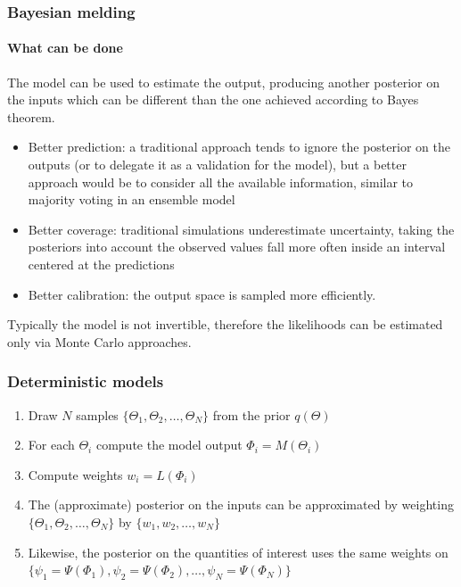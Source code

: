 \documentclass[aspectratio=43]{beamer}
\begin{document}
\begin{frame}
	\frametitle{Bayesian melding}
	\framesubtitle{What can be done}
	The model can be used to estimate the output, producing another posterior on the inputs which can be different than the one achieved according to Bayes theorem.
	\begin{itemize}
		\item Better prediction: a traditional approach tends to ignore the posterior on the outputs (or to delegate it as a validation for the model), but a better approach would be to consider all the available information, similar to majority voting in an ensemble model
		\item Better coverage: traditional simulations underestimate uncertainty, taking the posteriors into account the observed values fall more often inside an interval centered at the predictions
		\item Better calibration: the output space is sampled more efficiently.
	\end{itemize}

	Typically the model is not invertible, therefore the likelihoods can be estimated only via Monte Carlo approaches.
\end{frame}

\begin{frame}
	\frametitle{Deterministic models}
	\begin{enumerate}
		\item Draw $N$ samples $\{\Theta_1, \Theta_2, \dots, \Theta_N\}$ from the prior $q(\Theta)$
		\item For each $\Theta_i$ compute the model output $\Phi_i = M(\Theta_i)$
		\item Compute weights $w_i = L(\Phi_i)$
		\item The (approximate) posterior on the inputs can be approximated by weighting $\{\Theta_1, \Theta_2, \dots, \Theta_N\}$ by $\{w_1, w_2, \dots, w_N\}$
		\item Likewise, the posterior on the quantities of interest uses the same weights on $\{\psi_1 = \Psi(\Phi_1), \psi_2 = \Psi(\Phi_2), \dots, \psi_N = \Psi(\Phi_N)\}$
	\end{enumerate}
\end{frame}
\end{document}
